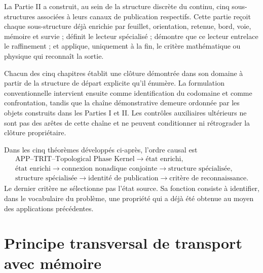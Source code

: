 
\ifdefined\HMTSucesoraStructureTrace
\fi

La Partie II a construit, au sein de la structure discrète du continu, cinq
sous-structures associées à leurs canaux de publication respectifs. Cette partie reçoit
chaque sous-structure déjà
enrichie par feuillet, orientation, retenue, bord, voie, mémoire et
survie ; définit le lecteur spécialisé ; démontre que ce lecteur
entrelace le raffinement ; et applique, uniquement à la fin, le critère mathématique ou
physique qui reconnaît la sortie.

Chacun des cinq chapitres établit une clôture démontrée dans son
domaine à partir de la structure de départ explicite qu'il énumère. La
formulation conventionnelle intervient ensuite comme identification du
codomaine et comme confrontation, tandis que la chaîne démonstrative demeure
ordonnée par les objets construits dans les Parties I et II. Les contrôles
auxiliaires ultérieurs ne sont pas des arêtes de cette chaîne et ne peuvent
conditionner ni rétrograder la clôture propriétaire.

Dans les cinq théorèmes développés ci-après, l'ordre causal est
\begin{equation}\label{eq:realizaciones-orden-causal}
 \begin{gathered}
 \text{APP--TRIT--Topological Phase Kernel}
 \longrightarrow \text{état enrichi},\\
 \text{état enrichi}
 \longrightarrow \text{connexion nonadique conjointe}
 \longrightarrow \text{structure spécialisée},\\
 \text{structure spécialisée}
 \longrightarrow \text{identité de publication}
 \longrightarrow \text{critère de reconnaissance}.
 \end{gathered}
\end{equation}
Le dernier critère ne sélectionne pas l'état source. Sa fonction consiste à
identifier, dans le vocabulaire du problème, une propriété qui a déjà été
obtenue au moyen des applications précédentes.

\section*{Principe transversal de transport avec mémoire}

